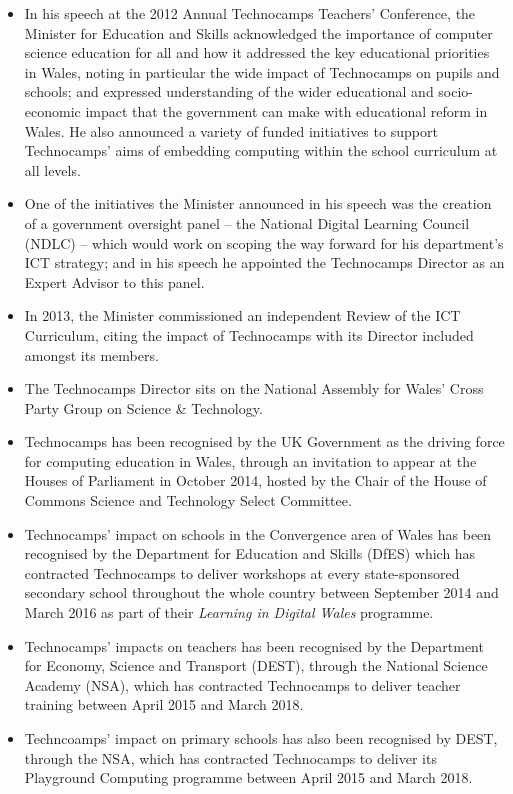 \documentclass[conference]{IEEEtran}
\begin{document}
\begin{itemize}

\item In his speech at the 2012 Annual Technocamps Teachers'
Conference, %
the Minister for Education and Skills
acknowledged the importance of computer science education for all and
how it addressed the key educational priorities in Wales, noting in particular
the wide impact of Technocamps on pupils and schools; and expressed 
understanding of the wider educational and socio-economic impact that
the government can make with educational reform in Wales. He also
announced a variety of funded initiatives to support Technocamps' aims
of embedding computing within the school curriculum at all levels.

\item One of the initiatives the Minister announced in his speech was
the creation of a government oversight panel -- the National
Digital Learning Council
(NDLC) %
-- which would work on scoping the way forward for his department's
ICT strategy; and in his speech he appointed the
Technocamps Director as an Expert Advisor to this panel.

\item In 2013, the Minister commissioned an independent Review of the ICT
Curriculum, citing the impact of Technocamps with its Director
included amongst its members.

\item The Technocamps Director sits on
the National Assembly for Wales' Cross Party Group on Science \& Technology.

\item Technocamps has been recognised by the UK Government as the driving
force for computing education in Wales, through an invitation to
appear at the Houses of Parliament in October 2014, hosted by the
Chair of the House of Commons Science and Technology Select Committee.

\item Technocamps' impact on schools in the Convergence area
of Wales has been recognised by the Department for Education and Skills (DfES)
which has contracted Technocamps to deliver workshops at every
state-sponsored secondary school throughout the whole country between
September 2014 and March 2016 as part of their \emph{Learning in
Digital Wales} programme.

\item Technocamps' impacts on teachers has been recognised by
the Department for Economy, Science and Transport (DEST), through the
National Science Academy (NSA), which has contracted Technocamps to deliver
teacher training between April 2015 and March 2018.

\item Techncoamps' impact on primary schools has also been
recognised by DEST, through the NSA, which has contracted
Technocamps to deliver its Playground Computing programme between
April 2015 and March 2018.

\end{itemize}
\end{document}
